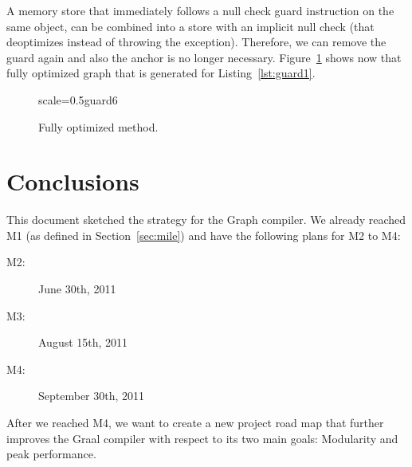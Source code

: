 \documentclass[twocolumn]{svjour3}
\begin{document}
A memory store that immediately follows a null check guard instruction on the same object, can be combined into a store with an implicit null check (that deoptimizes instead of throwing the exception).
Therefore, we can remove the guard again and also the anchor is no longer necessary.
Figure~\ref{fig:guard6} shows now that fully optimized graph that is generated for Listing~\ref{lst:guard1}.

\begin{figure}[h]
  \centering
\begin{digraphenv}{scale=0.5}{guard6}
\end{digraphenv}
  \caption{Fully optimized method.}
  \label{fig:guard6}
\end{figure}


\section{Conclusions}
\label{sec:conclusions}
This document sketched the strategy for the Graph compiler.
We already reached M1 (as defined in Section~\ref{sec:mile}) and have the following plans for M2 to M4:
\begin{description}
\item[M2:] June 30th, 2011
\item[M3:] August 15th, 2011
\item[M4:] September 30th, 2011
\end{description}
After we reached M4, we want to create a new project road map that further improves the Graal compiler with respect to its two main goals: Modularity and peak performance.
\end{document}
